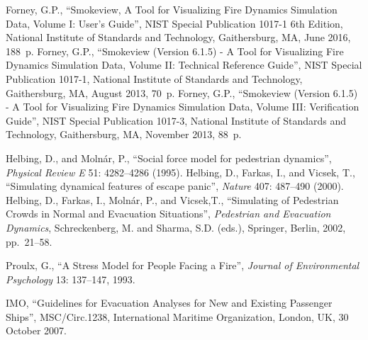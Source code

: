 \documentclass{article}
\begin{document}
\renewcommand{\bibname}{References}
\begin{thebibliography}{99}

%
 Forney, G.P., ``Smokeview, A Tool for
  Visualizing Fire Dynamics Simulation Data, Volume I: User's Guide'',
  NIST Special Publication 1017-1 6th Edition, National Institute of
  Standards and Technology, Gaithersburg, MA, June 2016, 188~p.
%
 Forney, G.P., ``Smokeview (Version 6.1.5) - A
  Tool for Visualizing Fire Dynamics Simulation Data, Volume II:
  Technical Reference Guide'', NIST Special Publication 1017-1,
  National Institute of Standards and Technology, Gaithersburg, MA,
  August 2013, 70~p.
%
 Forney, G.P., ``Smokeview (Version 6.1.5) - A
  Tool for Visualizing Fire Dynamics Simulation Data, Volume III:
  Verification Guide'', NIST Special Publication 1017-3, National
  Institute of Standards and Technology, Gaithersburg, MA, November
  2013, 88~p.

%
 Helbing, D., and Moln\'ar, P., ``Social force
  model for pedestrian dynamics'', \emph{Physical Review E} 51:
  4282--4286 (1995).
%
 Helbing, D., Farkas, I., and Vicsek, T.,
  ``Simulating dynamical features of escape panic'', \emph{Nature}
  407: 487--490 (2000).
%
 Helbing, D., Farkas, I., Moln\'ar, P., and
  Vicsek,T., ``Simulating of Pedestrian Crowds in Normal and
  Evacuation Situations'', \emph{Pedestrian and Evacuation Dynamics},
  Schreckenberg, M. and Sharma, S.D. (eds.), Springer, Berlin, 2002,
  pp.~21--58.

%
 Proulx, G., ``A Stress Model for People Facing a
  Fire'', \emph{Journal of Environmental Psychology} 13: 137--147,
  1993.
%
%

 IMO, ``Guidelines for Evacuation Analyses for
  New and Existing Passenger Ships'', MSC/Circ.1238, International
  Maritime Organization, London, UK, 30 October 2007.

%

%
\end{thebibliography}
\end{document}
